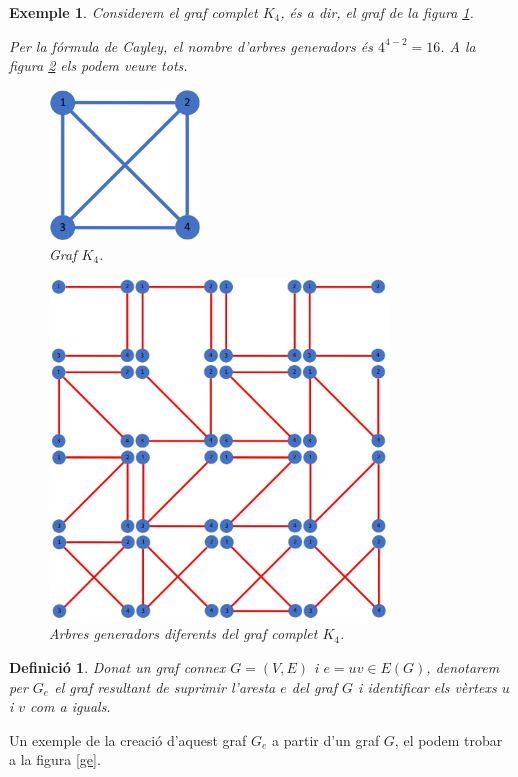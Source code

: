\documentclass{article}
\newtheorem{definition}{Definició}[section]
\newtheorem{example}{Exemple}[section]
\begin{document}
\begin{example}\label{ex1}
    Considerem el graf complet $K_4$, és a dir, el graf de la figura \ref{k4}.\par Per la fórmula de Cayley, el nombre d'arbres generadors és $4^{4-2} = 16$. A la figura \ref{k4_16} els podem veure tots.
    \begin{figure}[H]
        \centering
        \includegraphics[width=4cm]{Imatges/graf2.jpg}
        \caption{Graf $K_4$.}
        \label{k4}
    \end{figure}
    \begin{figure}[H]
        \centering
        \includegraphics[width=9cm]{Imatges/graf2_16.jpg}
        \caption{Arbres generadors diferents del graf complet $K_4$.}
        \label{k4_16}
    \end{figure}
\end{example}
\begin{definition}
    Donat un graf connex $G =(V,E)$ i $e = uv \in E(G)$, denotarem per $G_e$ el graf resultant de suprimir l'aresta $e$ del graf $G$ i identificar els vèrtexs $u$ i $v$ com a iguals.
\end{definition}
Un exemple de la creació d'aquest graf $G_e$ a partir d'un graf $G$, el podem trobar a la figura \ref{ge}.
\end{document}
